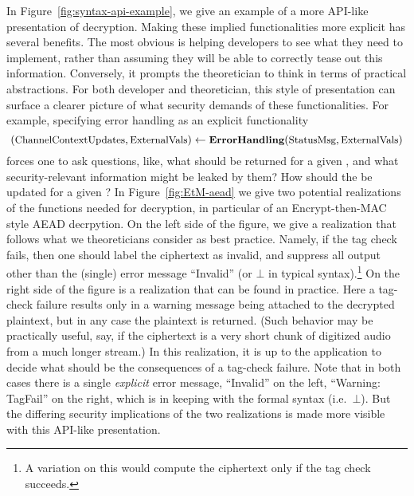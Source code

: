In Figure~\ref{fig:syntax-api-example}, we give an example of a more
API-like presentation of decryption.
%
Making these implied functionalities more explicit has several benefits.  The
most obvious is helping developers to see what they need to implement, rather
than assuming they will be able to correctly tease out this information.
Conversely, it prompts the theoretician to think in terms of practical
abstractions.
%
For both developer and theoretician, this style of presentation can surface a
clearer picture of what security demands of these functionalities. For example,
specifying error handling as an explicit functionality
\[
(\varfont{ChannelContextUpdates}, \varfont{ExternalVals}) \gets
                                  \algfont{ErrorHandling}(%
                                  \varfont{StatusMsg}, \varfont{ExternalVals})
\]
forces one to ask questions, like, what  should
be returned for a given , and what
security-relevant information might be leaked by them?  How should the
 be updated for a given ?
%
In Figure~\ref{fig:EtM-aead} we give two potential realizations of the
functions needed for decryption, in particular of an Encrypt-then-MAC
style AEAD decrpytion.  On the left side of the figure, we
give a realization that follows what we theoreticians consider as best
practice.  Namely, if the tag check fails, then one should label the
ciphertext as invalid, and suppress all output other than the (single)
error message ``Invalid'' (or $\bot$ in typical syntax).\footnote{A
  variation on this would compute the ciphertext only if the tag check
succeeds.}
%
On the right side of the figure is a realization that can be found in
practice.  Here a tag-check failure results only in a warning message
being attached to the decrypted plaintext, but in any case the
plaintext is returned.  (Such behavior may be practically useful, say,
if the ciphertext is a very short chunk of digitized audio from a much
longer stream.)  In this realization, it is up to the application to
decide what should be the consequences of a tag-check failure. Note
that in both cases there is a single \emph{explicit} error message,
``Invalid'' on the left, ``Warning: TagFail'' on the right,
which is in keeping with the formal syntax (i.e.\ $\bot$).  But the
differing security implications of the two realizations is made more
visible with this API-like presentation.  


